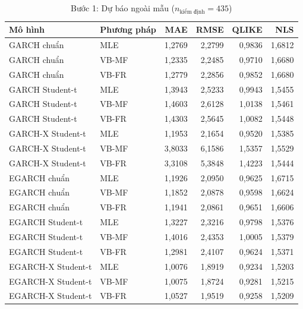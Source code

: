 \documentclass[11pt,a4paper]{article}
\begin{document}
\begin{table}[H]\centering\footnotesize
\caption{Bước 1: Dự báo ngoài mẫu ($n_{\text{kiểm định}}=435$)}\label{tab:b1-ngoai-mau}
\begin{tabular}{l l r r r r}
\toprule
\textbf{Mô hình} & \textbf{Phương pháp} & \textbf{MAE} & \textbf{RMSE} & \textbf{QLIKE} & \textbf{NLS} \\
\midrule
GARCH chuẩn & MLE & 1,2769 & 2,2799 & 0,9836 & 1,6812 \\
GARCH chuẩn & VB-MF & 1,2335 & 2,2485 & 0,9710 & 1,6680 \\
GARCH chuẩn & VB-FR & 1,2779 & 2,2856 & 0,9852 & 1,6680 \\
GARCH Student-t & MLE & 1,3943 & 2,5233 & 0,9943 & 1,5455 \\
GARCH Student-t & VB-MF & 1,4603 & 2,6128 & 1,0138 & 1,5461 \\
GARCH Student-t & VB-FR & 1,4303 & 2,5645 & 1,0082 & 1,5448 \\
GARCH-X Student-t & MLE & 1,1953 & 2,1654 & 0,9520 & 1,5385 \\
GARCH-X Student-t & VB-MF & 3,8033 & 6,1586 & 1,5357 & 1,5529 \\
GARCH-X Student-t & VB-FR & 3,3108 & 5,3848 & 1,4223 & 1,5444 \\
EGARCH chuẩn & MLE & 1,1926 & 2,0950 & 0,9625 & 1,6715 \\
EGARCH chuẩn & VB-MF & 1,1852 & 2,0878 & 0,9598 & 1,6624 \\
EGARCH chuẩn & VB-FR & 1,1941 & 2,0861 & 0,9651 & 1,6606 \\
EGARCH Student-t & MLE & 1,3227 & 2,3216 & 0,9798 & 1,5376 \\
EGARCH Student-t & VB-MF & 1,4016 & 2,4353 & 1,0005 & 1,5379 \\
EGARCH Student-t & VB-FR & 1,2981 & 2,4107 & 0,9624 & 1,5371 \\
EGARCH-X Student-t & MLE & 1,0076 & 1,8919 & 0,9234 & 1,5203 \\
EGARCH-X Student-t & VB-MF & 1,0075 & 1,8724 & 0,9281 & 1,5215 \\
EGARCH-X Student-t & VB-FR & 1,0527 & 1,9519 & 0,9258 & 1,5209 \\
\bottomrule
\end{tabular}
\end{table}
\end{document}
